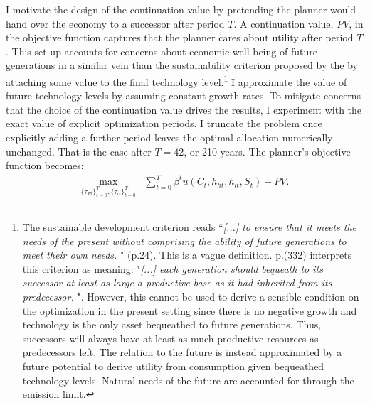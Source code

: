 I motivate the design of the continuation value by pretending the planner would hand over the economy to a successor after period $T$. A continuation value, $PV$, in the objective function captures that the planner cares about utility after period $T$. 
This set-up accounts for concerns about economic well-being of future generations in a similar vein than the sustainability criterion proposed by the \cite{UNSUS} by attaching some value to the final technology level.\footnote{ The sustainable development criterion reads ``\textit{[...] to ensure that it meets the needs of the present without comprising the ability of future generations to meet their own needs.
	}" (p.24). This is a vague definition.  \cite{Dasgupta2021} p.(332) interprets this criterion as meaning: 
	"\textit{[...] each generation should bequeath to its successor at least as large a productive base as it had inherited from its predecessor. }". 
	However, this cannot be used to derive a sensible condition on the optimization in the present setting since there is no negative growth and technology is the only asset bequeathed to future generations. Thus,
	successors will always have at least as much productive resources as predecessors left. The relation to the future is instead approximated by a future potential to derive utility from consumption given bequeathed technology levels. Natural needs of the future are accounted for through the emission limit. } I approximate the value of future technology levels by assuming constant growth rates.  
To mitigate concerns that the choice of the continuation value drives the results, I experiment with the exact value of explicit optimization periods. I truncate the problem once explicitly adding a further period leaves the optimal allocation numerically unchanged. That is the case after $T=42$, or 210 years. %
The planner's objective function becomes: 
\begin{align*}
	\underset{\{\tau_{Ft}\}_{t=0}^{T},\{\tau_{\iota t}\}_{t=0}^{T}}{\max}&\sum_{t=0}^{T}\beta^t u(C_{t}, h_{ht}, h_{lt}, S_t)
	+PV.
\end{align*}

